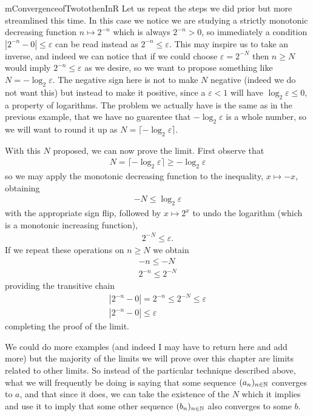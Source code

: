 \documentclass[11pt]{article}
\begin{document}
\begin{label example}{m}{ConvergenceofTwotothenInR}
Let us repeat the steps we did prior but more streamlined this time. In this case we notice we are studying a strictly monotonic decreasing function $n \mapsto 2^{-n}$ which is always $2^{-n} > 0$, so immediately a condition $|2^{-n} - 0| \le \varepsilon$ can be read instead as $2^{-n} \le \varepsilon$. This may inspire us to take an inverse, and indeed we can notice that if we could choose $\varepsilon = 2^{-N}$ then $n \ge N$ would imply $2^{-n} \le \varepsilon$ as we desire, so we want to propose something like $N = - \log_2 \varepsilon$. The negative sign here is not to make $N$ negative (indeed we do not want this) but instead to make it positive, since a $\varepsilon < 1$ will have $\log_2 \varepsilon \le 0$, a property of logarithms. The problem we actually have is the same as in the previous example, that we have no guarentee that $- \log_2 \varepsilon$ is a whole number, so we will want to round it up as $N = \lceil - \log_2 \varepsilon \rceil$.

With this $N$ proposed, we can now prove the limit. First observe that \begin{gather*}
N = \lceil - \log_2 \varepsilon \rceil \ge - \log_2 \varepsilon
\end{gather*}
so we may apply the monotonic decreasing function to the inequality, $x \mapsto -x$, obtaining \begin{gather*}
- N \le \log_2 \varepsilon
\end{gather*}
with the appropriate sign flip, followed by $x \mapsto 2^x$ to undo the logarithm (which is a monotonic increasing function), \begin{gather*}
2^{- N} \le \varepsilon.
\end{gather*}
If we repeat these operations on $n \ge N$ we obtain \begin{gather*}
-n \le -N \\
2^{-n} \le 2^{-N}
\end{gather*}
providing the transitive chain \begin{gather*}
|2^{-n} - 0| = 2^{-n} \le 2^{-N} \le \varepsilon \\
|2^{-n} - 0| \le \varepsilon
\end{gather*}
completing the proof of the limit.
\end{label example}

We could do more examples (and indeed I may have to return here and add more) but the majority of the limits we will prove over this chapter are limits related to other limits. So instead of the particular technique described above, what we will frequently be doing is saying that some sequence $(a_n)_{n \in \mathbb{N}}$ converges to $a$, and that since it does, we can take the existence of the $N$ which it implies and use it to imply that some other sequence $(b_n)_{n\in \mathbb{N}}$ also converges to some $b$.
\end{document}
